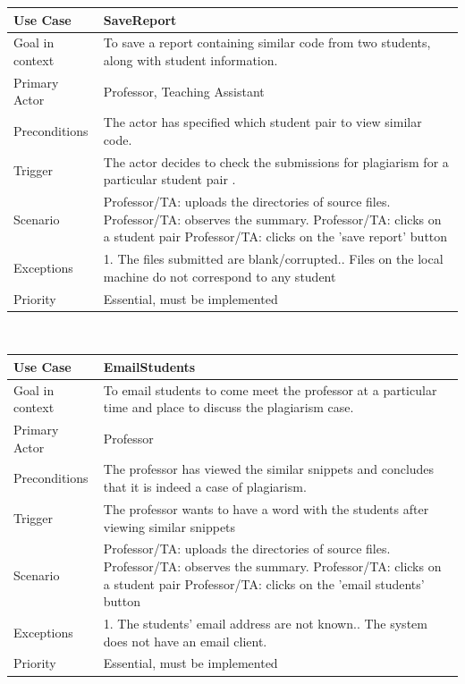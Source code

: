 \documentclass[12pt]{article}
\begin{document}
\begin{tabular}{ |p{3cm}||p{11.25cm}| }
 \hline
 \textbf{Use Case} & \textbf{SaveReport}\\
 \hline
 Goal in context & To save a report containing similar code from two students, along with student information.\\
 \hline
 Primary Actor & Professor, Teaching Assistant \\
 \hline
 Preconditions& The actor has specified which student pair to view similar code.\\
 \hline
 Trigger &The actor decides to check the submissions for plagiarism for a particular student pair .\\
 \hline
 Scenario    &Professor/TA: uploads the directories of source files.\newline
Professor/TA: observes the summary.\newline
Professor/TA: clicks on a student pair\newline
Professor/TA: clicks on the 'save report' button \\
\hline
 Exceptions&  
1. The files submitted are blank/corrupted.\newline
2. Files on the local machine do not correspond to any student
\\
\hline
 Priority& Essential, must be implemented \\
 \hline
\end{tabular} \\[2.0 em]

\begin{tabular}{ |p{3cm}||p{11.25cm}| }
 \hline
 \textbf{Use Case} & \textbf{EmailStudents}\\
 \hline
 Goal in context & To email students to come meet the professor at a particular time and place to discuss the plagiarism case.\\
 \hline
 Primary Actor & Professor \\
 \hline
 Preconditions& The professor has viewed the similar snippets and concludes that it is indeed a case of plagiarism. \\
 \hline
 Trigger &The professor wants to have a word with the students after viewing similar snippets\\
 \hline
 Scenario    &Professor/TA: uploads the directories of source files.\newline
Professor/TA: observes the summary.\newline
Professor/TA: clicks on a student pair\newline
Professor/TA: clicks on the 'email students' button \\
\hline
 Exceptions&  
1. The students' email address are not known.\newline
2. The system does not have an email client.
\\
\hline
 Priority& Essential, must be implemented \\
 \hline
\end{tabular} \\[2.0 em]
\end{document}

